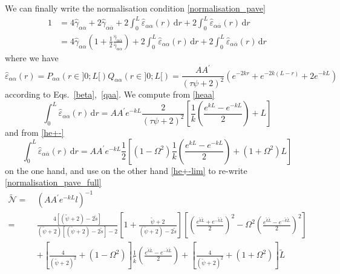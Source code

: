 \documentclass[pre,aps,superscriptaddress,nofootinbib]{revtex4}
\begin{document}
We can finally write the normalisation condition \eqref{normalisation_pave}
\begin{equation}
\begin{aligned}
1 &= 4 \hat{\gamma}_{\alpha\alpha} + 2 \hat{\gamma}_{\alpha\overline{\alpha}} + 2 \int_0^L \hat{\varepsilon}_{\alpha\alpha}(r) \, \mathrm{d}r + 2 \int_0^L \hat{\varepsilon}_{\alpha\overline{\alpha}}(r) \, \mathrm{d}r\\
&= 4 \hat{\gamma}_{\alpha\alpha} \left(1 + \frac{1}{2} \frac{\hat{\gamma}_{\alpha\overline{\alpha}}}{\hat{\gamma}_{\alpha\alpha}}\right) + 2 \int_0^L \hat{\varepsilon}_{\alpha\alpha}(r) \, \mathrm{d}r + 2 \int_0^L \hat{\varepsilon}_{\alpha\overline{\alpha}}(r) \, \mathrm{d}r
\label{normalisation_pave_full}
\end{aligned}
\end{equation}
where we have
\begin{equation}
\hat{\varepsilon}_{\alpha\alpha}(r) = P_{\alpha\alpha}(r \in ]0; L[) Q_{\alpha\alpha}(r \in ]0; L[) = \frac{A A^{\prime}}{(\tau \psi + 2)^2} \left(e^{-2 k r} + e^{-2 k (L - r)} + 2 e^{-k L}\right)
\label{heaa}
\end{equation}
according to Eqs.~\ref{beta},~\ref{qaa}. We compute from \eqref{heaa}
\begin{equation}
\int_0^L \hat{\varepsilon}_{\alpha\alpha}(r) \, \mathrm{d}r = A A^{\prime} e^{-k L} \frac{2}{(\tau \psi + 2)^2} \left[\frac{1}{k} \left(\frac{e^{k L} - e^{-k L}}{2}\right) + L\right]
\label{int_heaa}
\end{equation}
and from \eqref{he+-}
\begin{equation}
\int_0^L \hat{\varepsilon}_{\alpha\overline{\alpha}}(r) \, \mathrm{d}r = A A^{\prime} e^{-k L} \frac{1}{2} \left[\left(1 -\Omega^2\right) \frac{1}{k} \left(\frac{e^{k L} - e^{-k L}}{2}\right) + \left(1 + \Omega^2\right) L\right]
\end{equation}
on the one hand, and use on the other hand \eqref{he+-lim} to re-write \eqref{normalisation_pave_full}
\begin{equation}
\begin{aligned}
\tilde{\mathcal{N}} =~& (A A^{\prime} e^{-k L} l)^{-1}\\
=~& \frac{4 [(\tilde{\psi} + 2) - 2 \tilde{s}]}{(\tilde{\psi} + 2)[(\tilde{\psi} + 2) - 2 \tilde{s}] - 2} \left[1 + \frac{\tilde{\psi} + 2}{(\tilde{\psi} + 2) - 2 \tilde{s}}\right] \left[\left(\frac{e^{\tilde{k} \tilde{L}} + e^{-\tilde{k} \tilde{L}}}{2}\right)^2 - \Omega^2 \left(\frac{e^{\tilde{k} \tilde{L}} - e^{-\tilde{k} \tilde{L}}}{2}\right)^2\right]\\
&+ \left[\frac{4}{(\tilde{\psi} + 2)^2} + (1 - \Omega^2)\right] \frac{1}{\tilde{k}} \left(\frac{e^{\tilde{k} \tilde{L}} - e^{-\tilde{k} \tilde{L}}}{2}\right) + \left[\frac{4}{(\tilde{\psi} + 2)^2} + (1 + \Omega^2)\right] \tilde{L}
\end{aligned}
\label{normalisation_factor_pave}
\end{equation}
\end{document}
